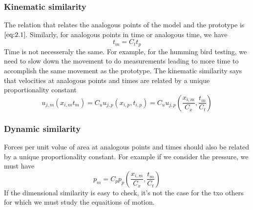 			\subsubsection{Kinematic similarity}
				The relation that relates the analogous points of the model and the prototype is $\eqref{eq:2.1}$. Similarly, for analogous points in time or analogous time, we have 
				\begin{equation}
					t_{m} = C_t t_{p}
				\end{equation}
				Time is not necesseraly the same. For example, for the humming bird testing, we need to slow down the movement to do measurements leading to more time to accomplish the same movement as the prototype. The kinematic similarity says that velocities at analogous points and times are related by a unique proportionality constant 
				\begin{equation}
					u_{j,m} (x_{i,m}t_m) = C_u u_{j,p} (x_{i,p},t_{i,p}) = C_u u_{j,p} \left(\frac{x_{i,m}}{C_x},\frac{t_m}{C_t}\right)
				\end{equation}
				
			\subsubsection{Dynamic similarity}
				Forces per unit volue of area at analogous points and times should also be related by a unique proportionality constant. For example if we consider the pressure, we must have 
				\begin{equation}
					p_{m} = C_p p_{p}\left(\frac{x_{i,m}}{C_x},\frac{t_m}{C_t}\right)
				\end{equation}
				If the dimensional similarity is easy to check, it's not the case for the txo others for which we must study the equaitions of motion. 
				
